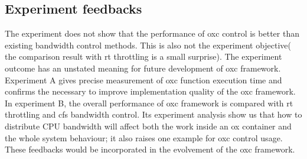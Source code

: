 \subsection{Experiment feedbacks}
The experiment does not show that the performance of oxc control is better than
existing bandwidth control methods. This is also not the experiment objective( the
comparison result with rt throttling is a small surprise). The experiment outcome
has an unstated meaning for future development of oxc framework.
Experiment A gives precise measurement of oxc function execution time and 
confirms the necessary to improve implementation quality of the oxc framework.
In experiment B, the overall performance of oxc framework is compared with
rt throttling and cfs bandwidth control. Its experiment analysis show us that
how to distribute CPU bandwidth will affect both the work inside an ox container
and the whole system behaviour; it also raises one example for oxc control usage. 
These feedbacks would be incorporated in the evolvement of the oxc framework.
